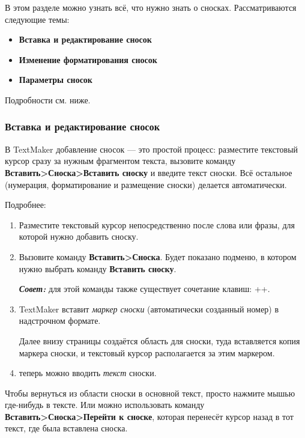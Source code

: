 ﻿\documentclass[a4paper,10pt]{article}
\begin{document}
В этом разделе можно узнать всё, что нужно знать о сносках. Рассматриваются следующие темы:
\begin{itemize}
 \item \textbf{Вставка и редактирование сносок}
 \item \textbf{Изменение форматирования сносок}
 \item \textbf{Параметры сносок}
\end{itemize}

Подробности см. ниже.

\subsubsection{Вставка и редактирование сносок}
В TextMaker добавление сносок — это простой процесс: разместите текстовый курсор сразу за нужным фрагментом текста, вызовите команду \textbf{Вставить>Сноска>Вставить сноску} и введите текст сноски. Всё остальное (нумерация, форматирование и размещение сноски) делается автоматически.

Подробнее:

\begin{enumerate}
 \item Разместите текстовый курсор непосредственно после слова или фразы, для которой нужно добавить сноску.
 \item Вызовите команду \textbf{Вставить>Сноска}. Будет показано подменю, в котором нужно выбрать команду \textbf{Вставить сноску}.
 
 \begin{mdframed}[backgroundcolor=blue!10]
\textbf{\textit{Совет:}} для этой команды также существует сочетание клавиш: ++.
\end{mdframed}
\item TextMaker вставит \textit{маркер сноски} (автоматически созданный номер) в надстрочном формате.

Далее внизу страницы создаётся область для сноски, туда вставляется копия маркера сноски, и текстовый курсор располагается за этим  маркером.
\item теперь можно вводить \textit{текст} сноски.
\end{enumerate}

Чтобы вернуться из области сноски в основной текст, просто нажмите мышью где-нибудь в тексте. Или можно использовать команду \textbf{Вставить>Сноска>Перейти к сноске}, которая перенесёт курсор назад в тот текст, где была вставлена сноска.
\end{document}
